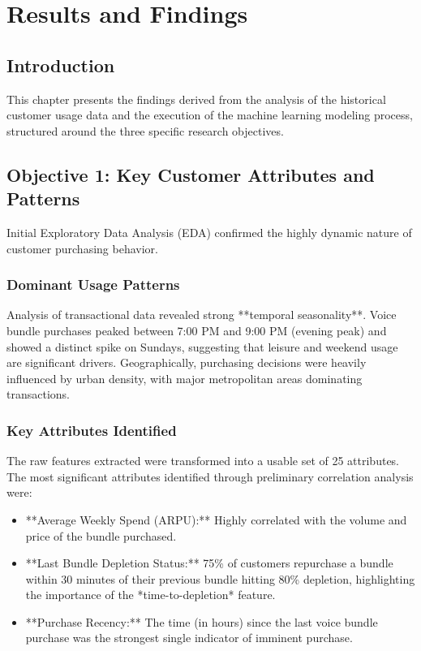 \documentclass[12pt, a4paper]{report}
\begin{document}
\chapter{Results and Findings}
\label{ch:results}

\section{Introduction}
This chapter presents the findings derived from the analysis of the historical customer usage data and the execution of the machine learning modeling process, structured around the three specific research objectives.

\section{Objective 1: Key Customer Attributes and Patterns}
Initial Exploratory Data Analysis (EDA) confirmed the highly dynamic nature of customer purchasing behavior.

\subsection{Dominant Usage Patterns}
Analysis of transactional data revealed strong **temporal seasonality**. Voice bundle purchases peaked between 7:00 PM and 9:00 PM (evening peak) and showed a distinct spike on Sundays, suggesting that leisure and weekend usage are significant drivers. Geographically, purchasing decisions were heavily influenced by urban density, with major metropolitan areas dominating transactions.

\subsection{Key Attributes Identified}
The raw features extracted were transformed into a usable set of 25 attributes. The most significant attributes identified through preliminary correlation analysis were:
\begin{itemize}
    \item **Average Weekly Spend (ARPU):** Highly correlated with the volume and price of the bundle purchased.
    \item **Last Bundle Depletion Status:** 75\% of customers repurchase a bundle within 30 minutes of their previous bundle hitting 80\% depletion, highlighting the importance of the *time-to-depletion* feature.
    \item **Purchase Recency:** The time (in hours) since the last voice bundle purchase was the strongest single indicator of imminent purchase.
\end{itemize}
\end{document}
